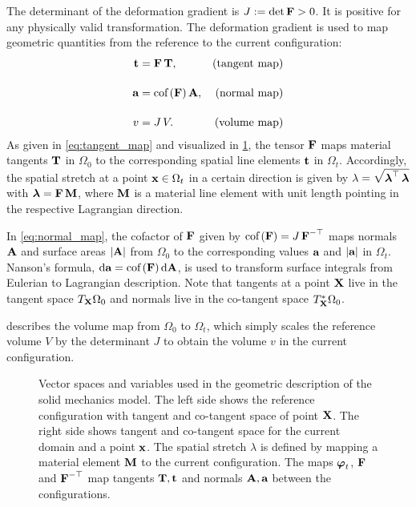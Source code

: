 The determinant of the deformation gradient is $J:= \hbox{det} \, \textbf{F}>0$. It is positive for any physically valid transformation.
The deformation gradient is used to map geometric quantities from the reference to the current configuration:
\begin{subequations}\label{eq:geometry_maps}
  \begin{align}
    \textbf{t} &= \textbf{F}\,\textbf{T}, & \text{(tangent map)} \label{eq:tangent_map}\\[4mm]
    \textbf{a} &= \hbox{cof} \,(\textbf{F})\,\textbf{A}, & \text{(normal map)} \label{eq:normal_map}\\[4mm]
    v &= J\,V. & \text{(volume map)}\label{eq:volume_map}
  \end{align}
\end{subequations}
%
As given in \cref{eq:tangent_map} and visualized in \cref{fig:geometric_quantities}, the tensor $\textbf{F}$ maps material tangents $\textbf{T}$ in $\Omega_0$ to the corresponding spatial line elements $\textbf{t}$ in $\Omega_t$. 
Accordingly, the spatial stretch at a point $\textbf{x} \in \Omega_t$ in a certain direction is given by $\lambda=\sqrt{\boldsymbol{\lambda}^\top\,\boldsymbol{\lambda}}$ with $\boldsymbol{\lambda} = \textbf{F}\,\textbf{M}$, where $\textbf{M}$ is a material line element with unit length pointing in the respective Lagrangian direction.

In \cref{eq:normal_map}, the cofactor of $\textbf{F}$ given by $\hbox{cof} \,(\textbf{F}) = J\,\textbf{F}^{-\top}$ maps normals $\textbf{A}$ and surface areas $|\textbf{A}|$ from $\Omega_0$ to the corresponding values $\textbf{a}$ and $|\textbf{a}|$ in $\Omega_t$. Nanson's formula, $\d \bfa = \cof(\bfF)\,\d\bfA$, is used to transform surface integrals from Eulerian to Lagrangian description.
Note that tangents at a point $\textbf{X}$ live in the tangent space $T_{\textbf{X}}\Omega_0$ and normals live in the co-tangent space $T^\ast_{\textbf{X}}\Omega_0$.

 describes the volume map from $\Omega_0$ to $\Omega_t$, which simply scales the reference volume $V$ by the determinant $J$ to obtain the volume $v$ in the current configuration.

\begin{figure}
  \centering%
  \def\svgwidth{0.7\textwidth}
  \caption{Vector spaces and variables used in the geometric description of the solid mechanics model. The left side shows the reference configuration with tangent and co-tangent space of point $\textbf{X}$. The right side shows tangent and co-tangent space for the current domain and a point $\textbf{x}$. The spatial stretch $\lambda$ is defined by mapping a material element $\textbf{M}$ to the current configuration. The maps $\boldsymbol{\varphi}_t$, $\textbf{F}$ and $\textbf{F}^{-\top}$ map tangents $\textbf{T},\textbf{t}$ and normals $\textbf{A},\textbf{a}$ between the configurations.}%
  \label{fig:geometric_quantities}%
\end{figure}

